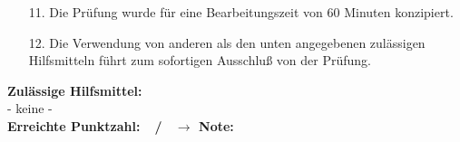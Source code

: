 \documentclass[addpoints,a4paper,ngerman,10pt,answers]{exam}
\begin{document}
\begin{minipage}{0.75\textwidth}
\begin{flushleft}
\begin{enumerate}[leftmargin=*]
\\[\baselineskip]
\item[11.] Die Prüfung wurde für eine Bearbeitungszeit von 60 Minuten konzipiert.
\\[\baselineskip]
\item[12.] Die Verwendung von anderen als den unten angegebenen zulässigen
Hilfsmitteln führt zum sofortigen Ausschluß von der Prüfung.
\end{enumerate}
\vspace{.75cm}
{\textbf{\large Zulässige Hilfsmittel:}}
\\[2\baselineskip]
- keine -
\\[2\baselineskip]
{\textbf{\large Erreichte Punktzahl:\ \underline{\hspace{1.2cm}}\ / \numpoints\ $\rightarrow$ Note:\ \underline{\hspace{1.2cm}}}}
\end{flushleft}
\end{minipage}
\hspace{1cm}
\end{document}
